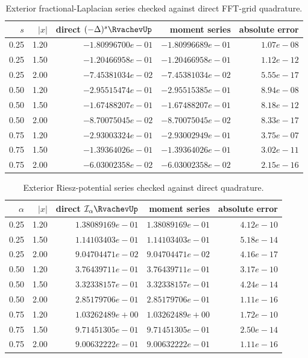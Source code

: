 \begin{table}[htbp]
\centering\small
\begin{tabular}{@{}rrrrr@{}}
\toprule
$s$ & $|x|$ & direct $(-\Delta)^s\RvachevUp$ & moment series & absolute error\\
\midrule
0.25 & 1.20 & $-1.80996700e-01$ & $-1.80996689e-01$ & $1.07e-08$\\
0.25 & 1.50 & $-1.20466958e-01$ & $-1.20466958e-01$ & $1.12e-12$\\
0.25 & 2.00 & $-7.45381034e-02$ & $-7.45381034e-02$ & $5.55e-17$\\
0.50 & 1.20 & $-2.95515474e-01$ & $-2.95515385e-01$ & $8.94e-08$\\
0.50 & 1.50 & $-1.67488207e-01$ & $-1.67488207e-01$ & $8.18e-12$\\
0.50 & 2.00 & $-8.70075045e-02$ & $-8.70075045e-02$ & $8.33e-17$\\
0.75 & 1.20 & $-2.93003324e-01$ & $-2.93002949e-01$ & $3.75e-07$\\
0.75 & 1.50 & $-1.39364026e-01$ & $-1.39364026e-01$ & $3.02e-11$\\
0.75 & 2.00 & $-6.03002358e-02$ & $-6.03002358e-02$ & $2.15e-16$\\
\bottomrule\end{tabular}
\caption{Exterior fractional-Laplacian series checked against direct FFT-grid quadrature.}
\label{p10:tab:fraclap-check}
\end{table}
\begin{table}[htbp]
\centering\small
\begin{tabular}{@{}rrrrr@{}}
\toprule
$\alpha$ & $|x|$ & direct $\mathcal I_\alpha\RvachevUp$ & moment series & absolute error\\
\midrule
0.25 & 1.20 & $1.38089169e-01$ & $1.38089169e-01$ & $4.12e-10$\\
0.25 & 1.50 & $1.14103403e-01$ & $1.14103403e-01$ & $5.18e-14$\\
0.25 & 2.00 & $9.04704471e-02$ & $9.04704471e-02$ & $4.16e-17$\\
0.50 & 1.20 & $3.76439711e-01$ & $3.76439711e-01$ & $3.17e-10$\\
0.50 & 1.50 & $3.32338157e-01$ & $3.32338157e-01$ & $4.24e-14$\\
0.50 & 2.00 & $2.85179706e-01$ & $2.85179706e-01$ & $1.11e-16$\\
0.75 & 1.20 & $1.03262489e+00$ & $1.03262489e+00$ & $1.72e-10$\\
0.75 & 1.50 & $9.71451305e-01$ & $9.71451305e-01$ & $2.50e-14$\\
0.75 & 2.00 & $9.00632222e-01$ & $9.00632222e-01$ & $1.11e-16$\\
\bottomrule\end{tabular}
\caption{Exterior Riesz-potential series checked against direct quadrature.}
\label{p10:tab:riesz-check}
\end{table}
